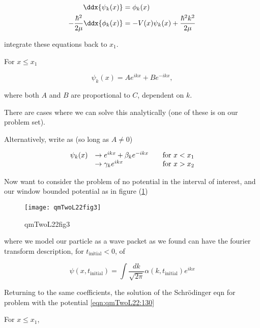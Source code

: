 \begin{align}\label{eqn:qmTwoL22:90}
\ddx{\psi_k(x)} &= \phi_k(x) \\
-\frac{\hbar^2}{2 \mu} \ddx{\phi_k(x)} &= - V(x) \psi_k(x) + \frac{\hbar^2 k^2}{2 \mu}
\end{align}

integrate these equations back to $x_1$.

For $x \le x_1$

\begin{equation}\label{eqn:qmTwoL22:110}
\psi_k(x) = A e^{i k x} + B e^{-i k x},
\end{equation}

where both $A$ and $B$ are proportional to $C$, dependent on $k$.

There are cases where we can solve this analytically (one of these is on our problem set).

Alternatively, write as (so long as $A \ne 0$)

\begin{equation}\label{eqn:qmTwoL22:130}
\begin{array}{l l l}
\psi_k(x)
&\rightarrow e^{i k x} + \beta_k e^{-i k x} & \quad \mbox{for $x < x_1$} \\
&\rightarrow \gamma_k e^{i k x} & \quad \mbox{for $x > x_2$}
\end{array}
\end{equation}

Now want to consider the problem of no potential in the interval of interest, and our window bounded potential as in figure (\ref{fig:qmTwoL22:qmTwoL22fig3})

\begin{figure}[htp]
   \centering
   \texttt{[image: qmTwoL22fig3]}
   \caption{qmTwoL22fig3}\label{fig:qmTwoL22:qmTwoL22fig3}
\end{figure}

where we model our particle as a wave packet as we found can have the fourier transform description, for $t_{\text{initial}} < 0$, of

\begin{equation}\label{eqn:qmTwoL22:150}
\psi(x, t_{\text{initial}}) = \int \frac{dk}{\sqrt{2 \pi}} \alpha(k, t_{\text{initial}}) e^{i k x}
\end{equation}

Returning to the same coefficients, the solution of the Schr\"{o}dinger eqn for problem with the potential \ref{eqn:qmTwoL22:130}

For $x \le x_1$,

